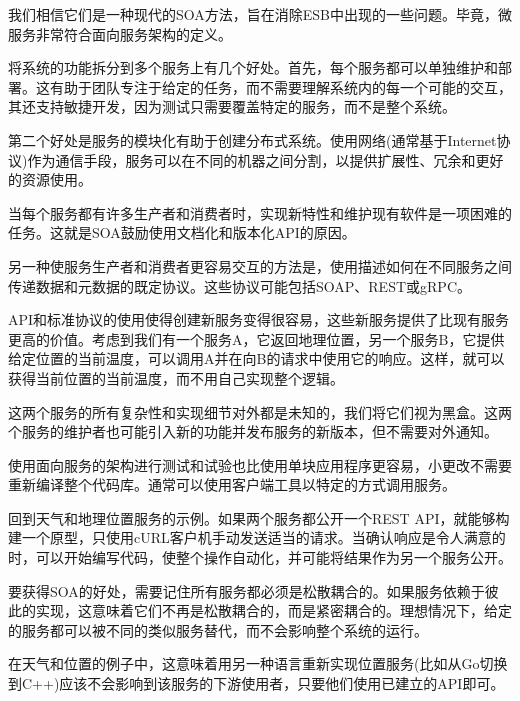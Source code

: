 我们相信它们是一种现代的SOA方法，旨在消除ESB中出现的一些问题。毕竟，微服务非常符合面向服务架构的定义。


将系统的功能拆分到多个服务上有几个好处。首先，每个服务都可以单独维护和部署。这有助于团队专注于给定的任务，而不需要理解系统内的每一个可能的交互，其还支持敏捷开发，因为测试只需要覆盖特定的服务，而不是整个系统。

第二个好处是服务的模块化有助于创建分布式系统。使用网络(通常基于Internet协议)作为通信手段，服务可以在不同的机器之间分割，以提供扩展性、冗余和更好的资源使用。

当每个服务都有许多生产者和消费者时，实现新特性和维护现有软件是一项困难的任务。这就是SOA鼓励使用文档化和版本化API的原因。

另一种使服务生产者和消费者更容易交互的方法是，使用描述如何在不同服务之间传递数据和元数据的既定协议。这些协议可能包括SOAP、REST或gRPC。

API和标准协议的使用使得创建新服务变得很容易，这些新服务提供了比现有服务更高的价值。考虑到我们有一个服务A，它返回地理位置，另一个服务B，它提供给定位置的当前温度，可以调用A并在向B的请求中使用它的响应。这样，就可以获得当前位置的当前温度，而不用自己实现整个逻辑。

这两个服务的所有复杂性和实现细节对外都是未知的，我们将它们视为黑盒。这两个服务的维护者也可能引入新的功能并发布服务的新版本，但不需要对外通知。

使用面向服务的架构进行测试和试验也比使用单块应用程序更容易，小更改不需要重新编译整个代码库。通常可以使用客户端工具以特定的方式调用服务。

回到天气和地理位置服务的示例。如果两个服务都公开一个REST API，就能够构建一个原型，只使用cURL客户机手动发送适当的请求。当确认响应是令人满意的时，可以开始编写代码，使整个操作自动化，并可能将结果作为另一个服务公开。

\begin{tcolorbox}[colback=blue!5!white,colframe=blue!75!black, title=Note]
\hspace*{0.7cm}要获得SOA的好处，需要记住所有服务都必须是松散耦合的。如果服务依赖于彼此的实现，这意味着它们不再是松散耦合的，而是紧密耦合的。理想情况下，给定的服务都可以被不同的类似服务替代，而不会影响整个系统的运行。
\end{tcolorbox}

在天气和位置的例子中，这意味着用另一种语言重新实现位置服务(比如从Go切换到C++)应该不会影响到该服务的下游使用者，只要他们使用已建立的API即可。

